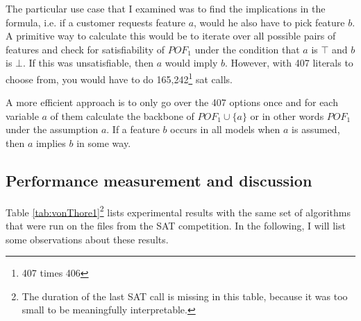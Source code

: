 The particular use case that I examined was to find the implications in the formula, i.e. if a customer requests feature $a$, would he also have to pick feature $b$. A primitive way to calculate this would be to iterate over all possible pairs of features 
and check for satisfiability of $POF_1$ under the condition that $a$ is $\top$ and $b$ is $\bot$. If this was unsatisfiable, then $a$ would imply $b$. However, with 407 literals to choose from, you would have to do 165,242\footnote{407 times 406} sat calls. 

A more efficient approach is to only go over the 407 options once and for each variable $a$ of them calculate the backbone of $POF_1 \cup \{a\}$ or in other words $POF_1$ under the assumption $a$. If a feature $b$ occurs in all models when $a$ is assumed, then $a$ implies $b$ in some way.


\subsection{Performance measurement and discussion}
Table \ref{tab:vonThore1}\footnote{The duration of the last SAT call is missing in this table, because it was too small to be meaningfully interpretable.} lists experimental results with the same set of algorithms that were run on the files from the SAT competition. In the following, I will list some observations about these results.


